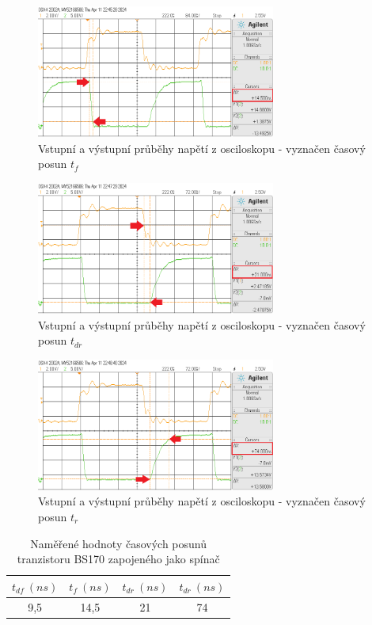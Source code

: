 \documentclass[a4paper, czech]{article}
\begin{document}
\begin{figure}[H]
    \centering
    \includegraphics[width=0.7\textwidth]{t_f.png}
    \caption{Vstupní a výstupní průběhy napětí z osciloskopu - vyznačen časový posun $t_{f}$}
\end{figure}

\begin{figure}[H]
    \centering
    \includegraphics[width=0.7\textwidth]{t_dr.png}
    \caption{Vstupní a výstupní průběhy napětí z osciloskopu - vyznačen časový posun $t_{dr}$}
\end{figure}

\begin{figure}[H]
    \centering
    \includegraphics[width=0.7\textwidth]{t_r.png}
    \caption{Vstupní a výstupní průběhy napětí z osciloskopu - vyznačen časový posun $t_{r}$}
\end{figure}

\begin{table}[H]
    \centering
    \begin{tabular}{cccc}
        \toprule
        $t_{df}\ (ns)$ & $t_{f}\ (ns)$ & $t_{dr}\ (ns)$ & $t_{dr}\ (ns)$ \\
        \midrule
        9,5 & 14,5 & 21 & 74 \\
        \bottomrule
    \end{tabular}
    \caption{Naměřené hodnoty časových posunů tranzistoru BS170 zapojeného jako spínač}
\end{table}
\end{document}
